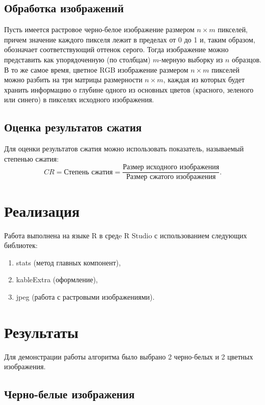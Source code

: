 \documentclass[a4paper]{article}
\begin{document}
\subsection{Обработка изображений}
Пусть имеется растровое черно-белое изображение размером $n\times m$ пикселей, причем значение каждого пикселя лежит в пределах от 0 до 1 и, таким образом, обозначает соответствующий оттенок серого. Тогда изображение можно представить как упорядоченную (по столбцам) $m$-мерную выборку из $n$ образцов.\\
В то же самое время, цветное RGB изображение размером $n\times m$ пикселей можно разбить на три матрицы размерности $n\times m$, каждая из которых будет хранить информацию о глубине одного из основных цветов (красного, зеленого или синего) в пикселях исходного изображения.
\subsection{Оценка результатов сжатия}
Для оценки результатов сжатия можно использовать показатель, называемый степенью сжатия:
\begin{equation}
    CR=\text{Степень сжатия}=\dfrac{\text{Размер исходного изображения}}{\text{Размер сжатого изображения}}.
\end{equation}
\section{Реализация}
Работа выполнена на языке R в средe R Studio с использованием следующих библиотек:
\begin{enumerate}
        \item stats (метод главных компонент),
        \item kableExtra (оформление),
        \item jpeg (работа с растровыми изображениями).
\end{enumerate}
\section{Результаты}
Для демонстрации работы алгоритма было выбрано 2 черно-белых и 2 цветных изображения. 
\subsection{Черно-белые изображения}
\end{document}
